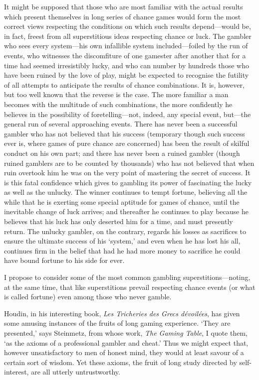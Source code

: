 \documentclass[letterpaper,12pt,oneside,openany]{memoir}
\begin{document}
It might be supposed that those who are most familiar
with the actual results which present themselves in long
series of chance games would form the most correct
views respecting the conditions on which such results
depend---would be, in fact, freest from all superstitious
ideas respecting chance or luck. The gambler who
sees every system---his own infallible system included---foiled
by the run of events, who witnesses the discomfiture
of one gamester after another that for a time
had seemed irresistibly lucky, and who can number by
hundreds those who have been ruined by the love of
play, might be expected to recognise the futility of all
attempts to anticipate the results of chance combinations.
It is, however, but too well known that the
reverse is the case. The more familiar a man becomes
with the multitude of such combinations, the more
confidently he believes in the possibility of foretelling---not,
indeed, any special event, but---the general run
of several approaching events. There has never been a
successful gambler who has not believed that his success
(temporary though such success ever is, where games
of pure chance are concerned) has been the result of
skilful conduct on his own part; and there has never been
a ruined gambler (though ruined gamblers are to be
counted by thousands) who has not believed that when
ruin overtook him he was on the very point of mastering
the secret of success. It is this fatal confidence which
gives to gambling its power of fascinating the lucky as
well as the unlucky. The winner continues to tempt
fortune, believing all the while that he is exerting
some special aptitude for games of chance, until the
inevitable change of luck arrives; and thereafter he
continues to play because he believes that his luck has
only deserted him for a time, and must presently return.
The unlucky gambler, on the contrary, regards his
losses as sacrifices to ensure the ultimate success of his
`system,' and even when he has lost his all, continues
firm in the belief that had he had more money to
sacrifice he could have bound fortune to his side for
ever.

I propose to consider some of the most common
gambling superstitions---noting, at the same time, that
like superstitions prevail respecting chance events (or
what is called fortune) even among those who never
gamble.

Houdin, in his interesting book, \textit{Les Tricheries des
Grecs d{\'e}voil{\'e}es}, has given some amusing instances of
the fruits of long gaming experience. `They are presented,'
says Steinmetz, from whose work, \textit{The Gaming
Table}, I quote them, `as the axioms of a professional
gambler and cheat.' Thus we might expect that,
however unsatisfactory to men of honest mind, they
would at least savour of a certain sort of wisdom. Yet
these axioms, the fruit of long study directed by self-interest,
are all utterly untrustworthy.
\end{document}
